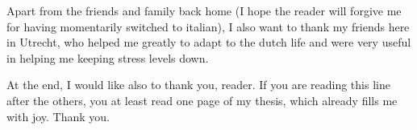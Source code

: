 Apart from the friends and family back home (I hope the reader will forgive me for having momentarily switched to italian), I also want to thank my friends here in Utrecht, who helped me greatly to adapt to the dutch life and were very useful in helping me keeping stress levels down.

At the end, I would like also to thank you, reader. If you are reading this line after the others, you at least read one page of my thesis, which already fills me with joy. Thank you.
